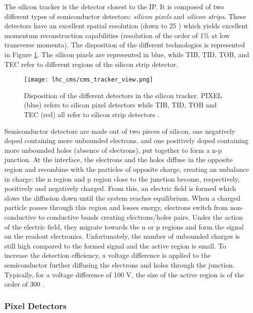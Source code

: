             The silicon tracker is the detector closest to the IP. It is composed of two different types of semiconductor detectors: \emph{silicon pixels} and \emph{silicon strips}. These detectors have an excellent spatial resolution (down to 25 \um{}) which yields excellent momentum reconstruction capabilities (resolution of the order of 1\% at low transverse momenta). The disposition of the different technologies is represented in Figure \ref{fig:lhc_and_cms__cms_tracker}. The silicon pixels are represented in blue, while TIB, TID, TOB, and TEC refer to different regions of the silicon strip detector. \\

            \begin{figure}[h!]
                \centering
                \texttt{[image: lhc\_cms/cms\_tracker\_view.png]}
                \caption{Disposition of the different detectors in the silicon tracker. PIXEL (blue) refers to silicon pixel detectors while TIB, TID, TOB and TEC (red) all refer to silicon strip detectors \Cite{CMS_at_LHC}.}
                \label{fig:lhc_and_cms__cms_tracker}
            \end{figure}

            Semiconductor detectors are made out of two pieces of silicon, one negatively doped containing more unbounded electrons, and one positively doped containing more unbounded holes (absence of electrons), put together to form a n-p junction. At the interface, the electrons and the holes diffuse in the opposite region and recombine with the particles of opposite charge, creating an unbalance in charge: the n region and p region close to the junction become, respectively, positively and negatively charged. From this, an electric field is formed which slows the diffusion down until the system reaches equilibrium. When a charged particle passes through this region and losses energy, electrons switch from non-conductive to conductive bands creating electrons/holes pairs. Under the action of the electric field, they migrate towards the n or p regions and form the signal on the readout electronics. Unfortunately, the number of unbounded charges is still high compared to the formed signal and the active region is small. To increase the detection efficiency, a voltage difference is applied to the semiconductor further diffusing the electrons and holes through the junction. Typically, for a voltage difference of 100 V, the size of the active region is of the order of 300 \um{}.

            \subsubsection{Pixel Detectors}

